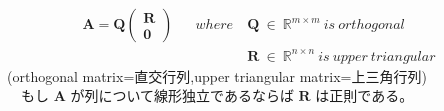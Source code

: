 \documentclass[dvipdfmx,10pt,presentation]{beamer}
\begin{document}
\begin{enumerate}
\begin{enumerate}
\begin{align*}
\bm{A} = \bm{Q}
\begin{pmatrix}
\bm{R}\\
\bm{0}
\end{pmatrix}&& where\ &\bm{Q}\ \in\ \mathbb{R}^{m\times m}\ is\ orthogonal \\
             &&& \bm{R}\ \in\ \mathbb{R}^{n\times n}\ is\ upper\ triangular
\end{align*}
(orthogonal matrix=直交行列,upper triangular matrix=上三角行列)\\
　もし \(\bm{A}\) が列について線形独立であるならば \(\bm{R}\) は正則である。\\
\end{enumerate}
\end{enumerate}
\end{document}
